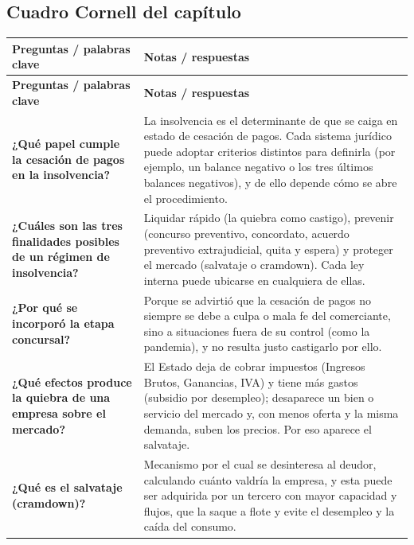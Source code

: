 \documentclass[12pt,oneside]{book}
\begin{document}
\subsection*{Cuadro Cornell del capítulo}

\begin{longtable}{>{\raggedright\arraybackslash}p{} >{\raggedright\arraybackslash}p{}}
\toprule
\textbf{Preguntas / palabras clave} & \textbf{Notas / respuestas} \\
\midrule
\endfirsthead
\toprule
\textbf{Preguntas / palabras clave} & \textbf{Notas / respuestas} \\
\midrule
\endhead
\bottomrule
\endlastfoot

\textbf{¿Qué papel cumple la cesación de pagos en la insolvencia?} &
La insolvencia es el determinante de que se caiga en estado de cesación de pagos. Cada sistema jurídico puede adoptar criterios distintos para definirla (por ejemplo, un balance negativo o los tres últimos balances negativos), y de ello depende cómo se abre el procedimiento. \\

\textbf{¿Cuáles son las tres finalidades posibles de un régimen de insolvencia?} &
Liquidar rápido (la quiebra como castigo), prevenir (concurso preventivo, concordato, acuerdo preventivo extrajudicial, quita y espera) y proteger el mercado (salvataje o cramdown). Cada ley interna puede ubicarse en cualquiera de ellas. \\

\textbf{¿Por qué se incorporó la etapa concursal?} &
Porque se advirtió que la cesación de pagos no siempre se debe a culpa o mala fe del comerciante, sino a situaciones fuera de su control (como la pandemia), y no resulta justo castigarlo por ello. \\

\textbf{¿Qué efectos produce la quiebra de una empresa sobre el mercado?} &
El Estado deja de cobrar impuestos (Ingresos Brutos, Ganancias, IVA) y tiene más gastos (subsidio por desempleo); desaparece un bien o servicio del mercado y, con menos oferta y la misma demanda, suben los precios. Por eso aparece el salvataje. \\

\textbf{¿Qué es el salvataje (cramdown)?} &
Mecanismo por el cual se desinteresa al deudor, calculando cuánto valdría la empresa, y esta puede ser adquirida por un tercero con mayor capacidad y flujos, que la saque a flote y evite el desempleo y la caída del consumo. \\


\end{longtable}
\end{document}
